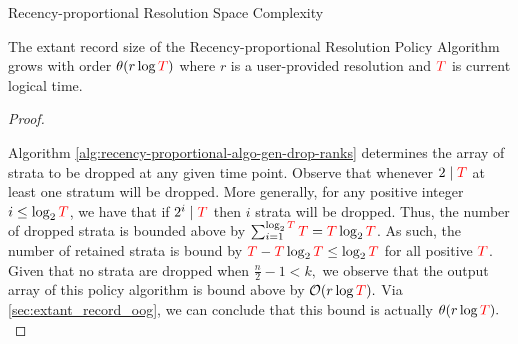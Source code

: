 \begin{theorem}{Recency-proportional Resolution Space Complexity}
\label{thm:recency-proportional-resolution-algo-space-complexity}

The \gls{extant record size} of the Recency-proportional Resolution Policy Algorithm grows with order $\mathcal{\theta}{(r \log \colorT)}$ where $r$ is a user-provided resolution and $\colorT$ is current logical time.

\end{theorem}

\begin{proof}
\label{prf:recency-proportional-resolution-algo-space-complexity}

Algorithm \ref{alg:recency-proportional-algo-gen-drop-ranks} determines the array of strata to be dropped at any given time point.
Observe that whenever $2 \mid \colorT$ at least one stratum will be dropped.
More generally, for any positive integer $i \le \log_2 \colorT$, we have that if $2^i \mid \colorT$ then $i$ strata will be dropped.
Thus, the number of dropped strata is bounded above by $\sum_{i=1}^{\log_2 \colorT} \colorT = \colorT \log_2 \colorT$.
As such, the number of retained strata is bound by $\colorT - \colorT \log_2 \colorT \le \log_2 \colorT$ for all positive $\colorT$.
Given that no strata are dropped when $\frac{n}{2} - 1 < k,$ we observe that the output array of this policy algorithm is bound above by $\mathcal{O}{(r \log \colorT)}.$
Via \ref{sec:extant_record_oog}, we can conclude that this bound is actually $\mathcal{\theta}{(r \log \colorT)}.$
\end{proof}
